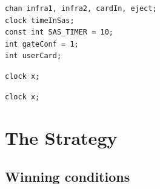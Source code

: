 \lstset{language=c++}
\lstset{commentstyle=\color{colComments}\textit,
basicstyle=\ttfamily\small, %
identifierstyle=\color{colIdentifier}, %
keywordstyle=\color{colKeys}, %
stringstyle=\color{colString}, %
commentstyle=\color{colComments}, %
columns=flexible, %
tabsize=2, %
extendedchars=true, %
showspaces=false, %
showstringspaces=false, %
numbers=left, %
numberstyle=\tiny, %
breaklines=true, %
breakautoindent=true, %
captionpos=b,%
}
\begin{lstlisting}[caption=Global declarations of the systems., label=globalDecl]
chan infra1, infra2, cardIn, eject;
clock timeInSas;
const int SAS_TIMER = 10;
int gateConf = 1;
int userCard;
\end{lstlisting}
\begin{lstlisting}[caption=Declarations of the user model., label=userDecl]
clock x;
\end{lstlisting}
\begin{lstlisting}[caption=Declarations of the sas model., label=sasDecl]
clock x;
\end{lstlisting}

\section{The Strategy}
\subsection{Winning conditions}

